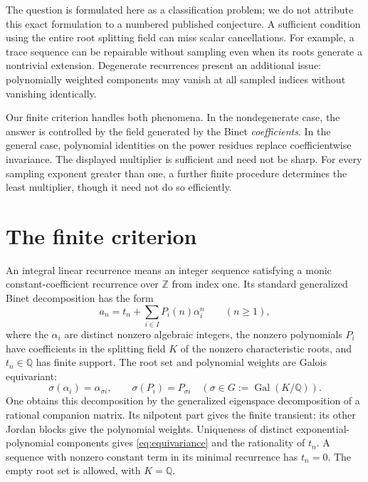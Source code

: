 \documentclass[11pt]{article}
\theoremstyle{definition}
\theoremstyle{remark}
\newcommand{\Q}{\mathbb Q}
\newcommand{\Z}{\mathbb Z}
\newcommand{\Gal}{\operatorname{Gal}}
\begin{document}
The question is formulated here as a classification problem; we do not attribute this exact formulation to a numbered published conjecture. A sufficient condition using the entire root splitting field can miss scalar cancellations. For example, a trace sequence can be repairable without sampling even when its roots generate a nontrivial extension. Degenerate recurrences present an additional issue: polynomially weighted components may vanish at all sampled indices without vanishing identically.

Our finite criterion handles both phenomena. In the nondegenerate case, the answer is controlled by the field generated by the Binet \emph{coefficients}. In the general case, polynomial identities on the power residues replace coefficientwise invariance. The displayed multiplier is sufficient and need not be sharp. For every sampling exponent greater than one, a further finite procedure determines the least multiplier, though it need not do so efficiently.

\section{The finite criterion}
An integral linear recurrence means an integer sequence satisfying a monic constant-coefficient recurrence over $\Z$ from index one. Its standard generalized Binet decomposition has the form
\begin{equation}\label{eq:binet}
 a_n=t_n+\sum_{i\in I}P_i(n)\alpha_i^n\qquad(n\geq1),
\end{equation}
where the $\alpha_i$ are distinct nonzero algebraic integers, the nonzero polynomials $P_i$ have coefficients in the splitting field $K$ of the nonzero characteristic roots, and $t_n\in\Q$ has finite support. The root set and polynomial weights are Galois equivariant:
\begin{equation}\label{eq:equivariance}
 \sigma(\alpha_i)=\alpha_{\sigma i},\qquad
 \sigma(P_i)=P_{\sigma i}\quad(\sigma\in G:=\Gal(K/\Q)).
\end{equation}
One obtains this decomposition by the generalized eigenspace decomposition of a rational companion matrix. Its nilpotent part gives the finite transient; its other Jordan blocks give the polynomial weights. Uniqueness of distinct exponential-polynomial components gives \eqref{eq:equivariance} and the rationality of $t_n$. A sequence with nonzero constant term in its minimal recurrence has $t_n=0$. The empty root set is allowed, with $K=\Q$.
\end{document}
